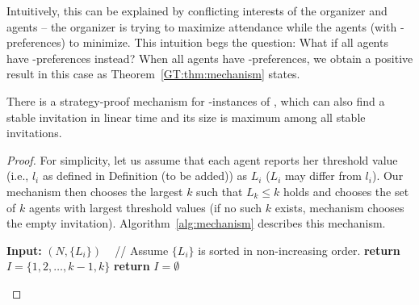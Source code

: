 Intuitively, this can be explained by conflicting interests of the organizer and agents -- the organizer is trying to maximize attendance while the agents (with \DEC-preferences) to minimize. 
This intuition begs the question: What if all agents have \INC-preferences instead? 
When all agents have \INC-preferences, we obtain a positive result in this case as Theorem~\ref{GT:thm:mechanism} states. 

\begin{theorem} \label{GT:thm:mechanism}
	There is a strategy-proof mechanism for \INC-instances of \AOIP, which can also find a stable invitation in linear time and its size is maximum among all stable invitations.
\end{theorem} 
\begin{proof}
For simplicity, let us assume that each agent reports her threshold value (i.e., $l_i$ as defined in Definition (to be added)) as $L_i$ ($L_i$ may differ from $l_i$). Our mechanism then chooses the largest $k$ such that $L_k \leq k$ holds and chooses the set of $k$ agents with largest threshold values (if no such $k$ exists, mechanism chooses the empty invitation). Algorithm~\ref{alg:mechanism} describes this mechanism.
\begin{algorithm}
	\caption{Strategy-proof Mechanism}
	\label{alg:mechanism}
\begin{algorithmic}[1]
	\State \textbf{Input:} $(N, \{L_i\})$ ~ // Assume $\{L_i\}$ is sorted in non-increasing order.
			\State \textbf{return} $I = \{1, 2, \dots, {k-1}, {k}\}$
		\EndIf
	\EndFor
	\State \textbf{return} $I = \emptyset$
\end{algorithmic}
\end{algorithm} 
	

\end{proof}
